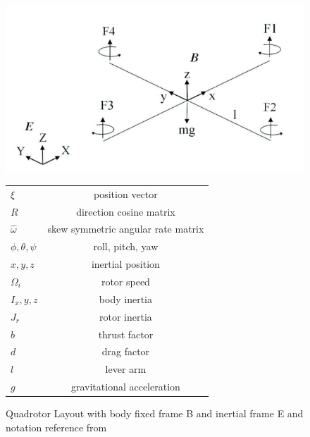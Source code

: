 \documentclass[conf]{new-aiaa}
\begin{document}
\begin{doublespace}
\begin{singlespace}
\begin{figure}
	\begin{minipage}{0.5\textwidth}
	\centering
	\includegraphics[scale= 0.45]{quad.png}
	\end{minipage}
	\begin{minipage}{0.5\textwidth}
		\begin{tabular}{| l | c |}
		  \hline			
		  $\xi$ & position vector\\
		  $R$ & direction cosine matrix\\
		  $\hat{\omega}$ &skew symmetric angular rate matrix\\
		  $\phi,\theta,\psi$ & roll, pitch, yaw\\
		  $x,y,z$ & inertial position\\
		  $\Omega_i$ & rotor speed\\
		  $I_x,y,z$ & body inertia\\
		  $J_r$ & rotor inertia\\
		  $b$ & thrust factor\\
		  $d$ & drag factor\\
		  $l$ & lever arm\\
		  $g$ & gravitational acceleration\\
		  \hline  
		\end{tabular}
	\end{minipage}
\end{figure}
\begin{figure}[!h]
	\caption{Quadrotor Layout with body fixed frame B and inertial frame E and notation reference from \citep{ICRApaper}}
	\label{fig:f1}	
\end{figure}
\end{singlespace}



\end{doublespace}
\end{document}
